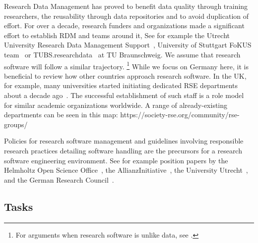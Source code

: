 \documentclass[a4paper]{article}
\begin{document}
Research Data Management has proved to benefit data quality through training researchers, the reusability through data repositories and to avoid duplication of effort.
For over a decade, research funders and organizations made a significant effort to establish RDM and teams around it, See for example the Utrecht University Research Data Management Support~\autocite{UtrechtRDM}, University of Stuttgart FoKUS team~\autocite{Boehlke2024} or TUBS.researchdata~\autocite{Grunwald2022} at TU Braunschweig.
We assume that research software will follow a similar trajectory.
\footnote{For arguments when research software is unlike data, see \autocite{Lamprecht2020}.}
While we focus on Germany here, it is beneficial to review how other countries approach research software.
In the UK, for example, many universities started initiating dedicated RSE departments about a decade ago~\autocite{Crouch2013}.
The successful establishment of such staff is a role model for similar academic organizations worldwide.
A range of already-existing departments can be seen in this map: https://society-rse.org/community/rse-groups/ 

Policies for research software management and guidelines involving responsible research practices detailing software handling are the precursors for a research software engineering environment.
See for example position papers by the Helmholtz Open Science Office~\autocite{Helmholtz2019a,Helmholtz2019b},
the AllianzInitiative~\autocite{Konrad2021},
the University Utrecht~\autocite{Utrecht2016b},
and the German Research Council~\autocite{dfg_gsp}.

\subsection{Tasks}
\end{document}
